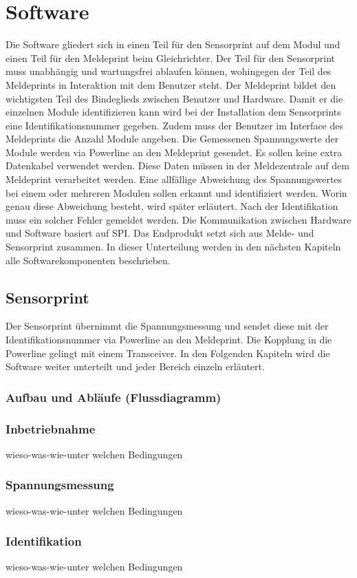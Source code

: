  \section{Software}
Die Software gliedert sich in einen Teil für den Sensorprint auf dem Modul und einen Teil für den Meldeprint beim Gleichrichter. Der Teil für den Sensorprint muss unabhängig und wartungsfrei ablaufen können, wohingegen der Teil des Meldeprints in Interaktion mit dem Benutzer steht. Der Meldeprint bildet den wichtigsten Teil des Bindeglieds zwischen Benutzer und Hardware. Damit er die einzelnen Module identifizieren kann wird bei der Installation dem Sensorprints eine Identifikationsnummer gegeben. Zudem muss der Benutzer im Interface des Meldeprints die Anzahl Module angeben. Die Gemessenen Spannungswerte der Module werden via Powerline an den Meldeprint gesendet. Es sollen keine extra Datenkabel verwendet werden. Diese Daten müssen in der Meldezentrale auf dem Meldeprint verarbeitet werden. Eine allfällige Abweichung des Spannungswertes bei einem oder mehreren Modulen sollen erkannt und identifiziert werden. Worin genau diese Abweichung besteht, wird später erläutert. Nach der Identifikation muss ein solcher Fehler gemeldet werden. Die Kommunikation zwischen Hardware und Software basiert auf SPI. Das Endprodukt setzt sich aus Melde- und Sensorprint zusammen. In dieser Unterteilung werden in den nächsten Kapiteln alle Softwarekomponenten beschrieben.
\subsection{Sensorprint}
Der Sensorprint übernimmt die Spannungsmessung und sendet diese mit der Identifikationsnummer via Powerline an den Meldeprint. Die Kopplung in die Powerline gelingt mit einem Transceiver. In den Folgenden Kapiteln wird die Software weiter unterteilt und jeder Bereich einzeln erläutert.
\subsubsection{Aufbau und Abläufe (Flussdiagramm)}
\subsubsection{Inbetriebnahme}
wieso-was-wie-unter welchen Bedingungen
\subsubsection{Spannungsmessung}
wieso-was-wie-unter welchen Bedingungen
\subsubsection{Identifikation}
wieso-was-wie-unter welchen Bedingungen
